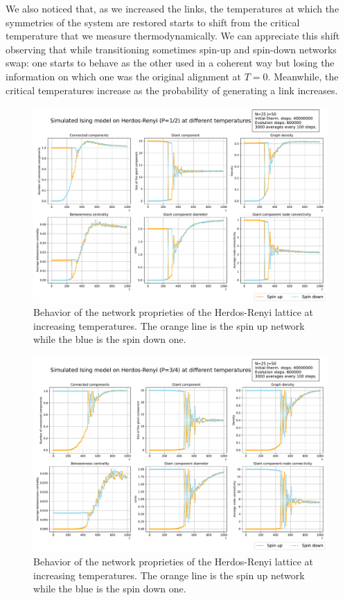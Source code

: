 We also noticed that, as we increased the links, the temperatures at which the symmetries of the system are restored starts to shift from the critical temperature that we measure thermodynamically. We can appreciate this shift observing that while transitioning sometimes spin-up and spin-down networks swap: one starts to behave as the other used in a coherent way but losing the information on which one was the original alignment at $T=0$. Meanwhile, the critical temperatures increase as the probability of generating a link increases.
\begin{figure}[!htb]
  \includegraphics[width=\linewidth]{Network meausres/HR.5_Network.pdf}
    \caption{Behavior of the network proprieties of the Herdos-Renyi lattice at increasing temperatures. The orange line is the spin up network while the blue is the spin down one.}
    \label{Fig:2RHNetworkmeasure}
\end{figure}
\begin{figure}[H]
  \includegraphics[width=\linewidth]{Network meausres/HR.75_Network.pdf}
    \caption{Behavior of the network proprieties of the Herdos-Renyi lattice at increasing temperatures. The orange line is the spin up network while the blue is the spin down one.}
    \label{Fig:3RHNetworkmeasure}
\end{figure}

